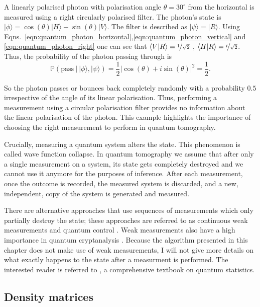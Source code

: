 \begin{example}
A linearly polarised photon with polarisation angle $\theta = 30^{\circ}$ from the horizontal is measured using a right circularly polarised filter. The photon's state is $\vert\phi\rangle = \cos(\theta)\vert H \rangle + \sin(\theta)\vert V \rangle$. The filter is described as $\vert\psi\rangle = \vert R \rangle$. Using Eqns.\ \eqref{eqn:quantum_photon_horizontal},\eqref{eqn:quantum_photon_vertical} and \eqref{eqn:quantum_photon_right} one can see that $\langle V \vert R \rangle = \nicefrac{1}{\sqrt{2}}$ , $\langle H \vert R \rangle = \nicefrac{i}{\sqrt{2}}$. Thus, the probability of the photon passing through is
%
\begin{equation}
	\mathbb{P}\left( \mbox{pass}\ \vert\ \vert\phi\rangle , \vert\psi\rangle \right) = \frac{1}{2}\left\vert\cos(\theta) + i\sin(\theta)\right\vert^2 = \frac{1}{2}.
\end{equation}

So the photon passes or bounces back completely randomly with a probability $0.5$ irrespective of the angle of its linear polarisation. Thus, performing a measurement using a circular polarisation filter provides no information about the linear polarisation of the photon. This example highlights the importance of choosing the right measurement to perform in quantum tomography.
\end{example}

Crucially, measuring a quantum system alters the state.	This phenomenon is called wave function collapse. In quantum tomography we assume that after only a single measurement on a system, its state gets completely destroyed and we cannot use it anymore for the purposes of inference. After each measurement, once the outcome is recorded, the measured system is discarded, and a new, independent, copy of the system is generated and measured.

There are alternative approaches that use sequences of measurements which only partially destroy the state; these approaches are referred to as continuous weak measurements and quantum control \citep{Smith2006}. Weak measurements also have a high importance in quantum cryptanalysis \citep{Pryde2004}. Because the algorithm presented in this chapter does not make use of weak measurements, I will not give more details on what exactly happens to the state after a measurment is performed. The interested reader is referred to \citep{Petz2008}, a comprehensive textbook on quantum statistics.

\subsection{Density matrices}

